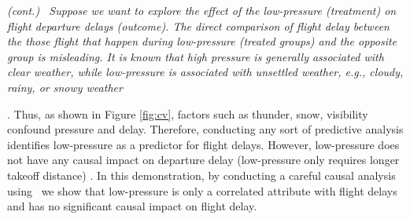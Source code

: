\begin{example} \em \delay (cont.) \ \em   Suppose we want to explore the effect of the low-pressure (treatment) on flight departure delays (outcome).  The direct comparison of
flight delay between the those flight that happen during low-pressure (treated groups) and the opposite group is misleading.  It is known that high pressure is generally associated with clear weather,    while low-pressure is associated with unsettled weather, e.g.,
    cloudy, rainy, or snowy weather. Thus, as shown in Figure \ref{fig:cv}, factors such as thunder, snow, visibility confound pressure and delay. Therefore, conducting any sort of predictive analysis identifies
    low-pressure as a predictor for flight delays. 
  However, low-pressure does not have any causal impact on departure delay
    (low-pressure only requires longer takeoff distance) \cite{FAA08}. In this demonstration, by conducting a careful causal analysis using \GSQL\, we show that low-pressure is only a correlated attribute with flight delays and has no significant causal impact on flight delay.
    
\end{example}



\vspace{-0.1cm}




